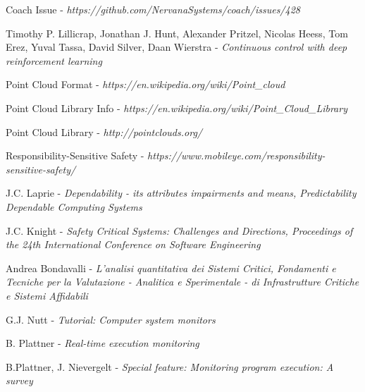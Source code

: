 \begin{thebibliography}{9}
Coach Issue - \textit{https://github.com/NervanaSystems/coach/issues/428}

Timothy P. Lillicrap, Jonathan J. Hunt, Alexander Pritzel, Nicolas Heess, Tom Erez, Yuval Tassa, David Silver, Daan Wierstra - \textit{Continuous control with deep reinforcement learning}

Point Cloud Format - \textit{https://en.wikipedia.org/wiki/Point\_cloud}

Point Cloud Library Info - \textit{https://en.wikipedia.org/wiki/Point\_Cloud\_Library}

Point Cloud Library - \textit{http://pointclouds.org/}

Responsibility-Sensitive Safety - \textit{https://www.mobileye.com/responsibility-sensitive-safety/}

J.C. Laprie - \textsl{Dependability - its attributes impairments and means, Predictability Dependable Computing Systems}

J.C. Knight - \textsl{Safety Critical Systems: Challenges and Directions, Proceedings of the 24th International Conference on Software Engineering}

Andrea Bondavalli - \textsl{L'analisi quantitativa dei Sistemi Critici, Fondamenti e Tecniche per la Valutazione - Analitica e Sperimentale - di Infrastrutture Critiche e Sistemi Affidabili}

G.J. Nutt - \textsl{Tutorial: Computer system monitors}

B. Plattner - \textsl{Real-time execution monitoring}

B.Plattner, J. Nievergelt - \textsl{Special feature: Monitoring program execution: A survey}


\end{thebibliography}